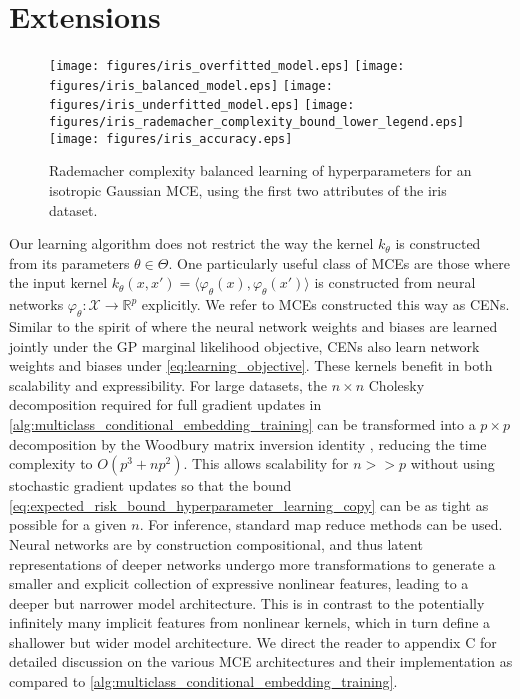 \documentclass[twoside]{article}
\begin{document}
	\section{Extensions}
	\label{sec:extensions}

		\begin{figure*}[t]
			\centering
			\texttt{[image: figures/iris\_overfitted\_model.eps]}
			\texttt{[image: figures/iris\_balanced\_model.eps]}
			\texttt{[image: figures/iris\_underfitted\_model.eps]}
			\texttt{[image: figures/iris\_rademacher\_complexity\_bound\_lower\_legend.eps]}
			\texttt{[image: figures/iris\_accuracy.eps]}
			\caption{Rademacher complexity balanced learning of hyperparameters for an isotropic Gaussian \gls{MCE}, using the first two attributes of the iris dataset.}
			\label{fig:iris}
		\end{figure*}
		
		Our learning algorithm does not restrict the way the kernel $k_{\theta}$ is constructed from its parameters $\theta \in \Theta$. One particularly useful class of \glspl{MCE} are those where the input kernel $k_{\theta}(x, x') = \langle \varphi_{\theta}(x), \varphi_{\theta}(x') \rangle$ is constructed from neural networks $\varphi_{\theta} : \mathcal{X} \to \mathbb{R}^{p}$ explicitly. We refer to \glspl{MCE} constructed this way as \glspl{CEN}. Similar to the spirit of \cite{wilson2016stochastic} where the neural network weights and biases are learned jointly under the \gls{GP} marginal likelihood objective, \glspl{CEN} also learn network weights and biases under \eqref{eq:learning_objective}. These kernels benefit in both scalability and expressibility. For large datasets, the $n \times n$ Cholesky decomposition required for full gradient updates in \cref{alg:multiclass_conditional_embedding_training} can be transformed into a $p \times p$ decomposition by the Woodbury matrix inversion identity \citep{higham2002accuracy}, reducing the time complexity to $O(p^{3} + np^{2})$. This allows scalability for $n >> p$ without using stochastic gradient updates so that the bound \eqref{eq:expected_risk_bound_hyperparameter_learning_copy} can be as tight as possible for a given $n$. For inference, standard map reduce methods can be used. Neural networks are by construction compositional, and thus latent representations of deeper networks undergo more transformations to generate a smaller and explicit collection of expressive nonlinear features, leading to a deeper but narrower model architecture. This is in contrast to the potentially infinitely many implicit features from nonlinear kernels, which in turn define a shallower but wider model architecture. We direct the reader to appendix C for detailed discussion on the various \gls{MCE} architectures and their implementation as compared to \cref{alg:multiclass_conditional_embedding_training}. 
		
\end{document}
